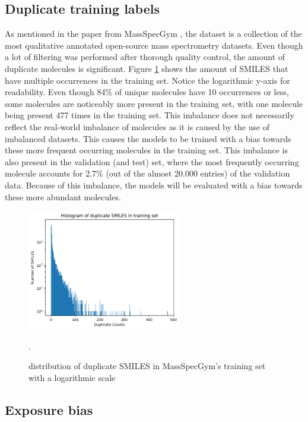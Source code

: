 \subsection{Duplicate training labels}
As mentioned in the paper from MassSpecGym \cite{bushuiev2024massspecgym}, the dataset is a collection of the most qualitative annotated open-source mass spectrometry datasets.
Even though a lot of filtering was performed after thorough quality control, the amount of duplicate molecules is significant.
Figure \ref{fig:duplicate_smiles} shows the amount of SMILES that have multiple occurrences in the training set. Notice the logarithmic y-axis for readability.
Even though 84\% of unique molecules have 10 occurrences or less, some molecules are noticeably more present in the training set, with one molecule being present 477 times in the training set.
This imbalance does not necessarily reflect the real-world imbalance of molecules as it is caused by the use of imbalanced datasets.
This causes the models to be trained with a bias towards these more frequent occurring molecules in the training set.
This imbalance is also present in the validation (and test) set, where the most frequently occurring molecule accounts for 2.7\% (out of the almost 20.000 entries) of the validation data.
Because of this imbalance, the models will be evaluated with a bias towards these more abundant molecules.
\begin{figure}[h]
    \centering
    \includegraphics[width=0.6\textwidth]{figures/discussion/duplicate_smiles_training_set.png}
    \caption{distribution of duplicate SMILES in MassSpecGym's training set with a logarithmic scale}.
    \label{fig:duplicate_smiles}
\end{figure}

\subsection{Exposure bias}

